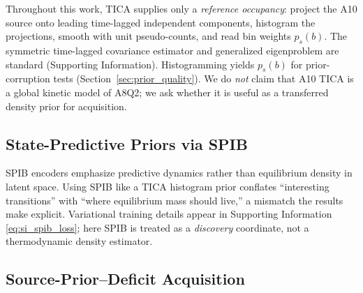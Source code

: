 Throughout this work, TICA supplies only a \emph{reference occupancy}: project the A10 source onto leading time-lagged independent components,\cite{perezhernandez2013tica,schwantes2013improvements,scherer2015pyemma} histogram the projections, smooth with unit pseudo-counts, and read bin weights $p_s(b)$.
The symmetric time-lagged covariance estimator and generalized eigenproblem are standard (Supporting Information).
Histogramming yields $p_s(b)$ for prior-corruption tests (Section~\ref{sec:prior_quality}).
We do \emph{not} claim that A10 TICA is a global kinetic model of A8Q2; we ask whether it is useful as a transferred density prior for acquisition.

\subsection{State-Predictive Priors via SPIB}

SPIB encoders\cite{wang2021spib,tishby2000information} emphasize predictive dynamics rather than equilibrium density in latent space.
Using SPIB like a TICA histogram prior conflates ``interesting transitions'' with ``where equilibrium mass should live,'' a mismatch the results make explicit.
Variational training details appear in Supporting Information \eqref{eq:si_spib_loss}; here SPIB is treated as a \emph{discovery} coordinate, not a thermodynamic density estimator.

\subsection{Source-Prior--Deficit Acquisition}
\label{sec:theory_score}

